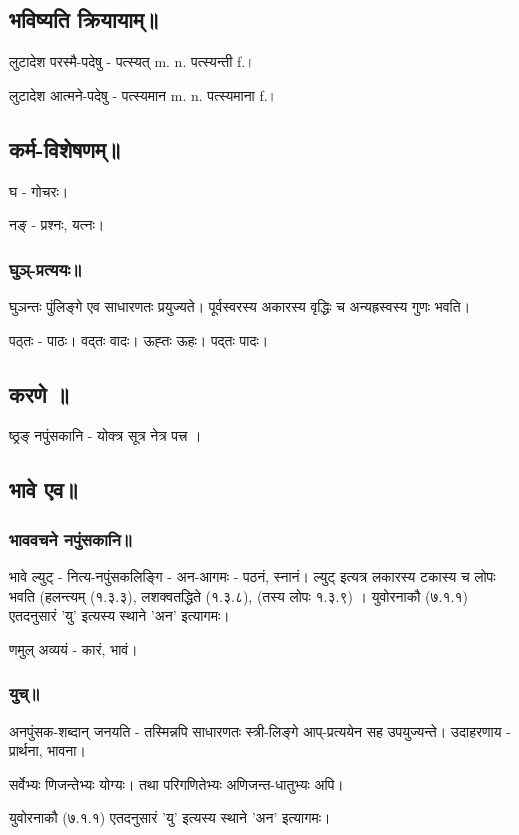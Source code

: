 \documentclass[oneside, article]{memoir}
\begin{document}
\subsection{भविष्यति क्रियायाम्॥}
लुटादेश परस्मै-पदेषु - पत्स्यत् m. n. पत्स्यन्ती f.।

लुटादेश आत्मने-पदेषु - पत्स्यमान m. n. पत्स्यमाना f.।

\subsection{कर्म-विशेषणम्॥}
घ - गोचरः।

नङ् - प्रश्नः, यत्नः।


\subsubsection{घुञ्-प्रत्ययः॥}
घुञन्तः पुंलिङ्गे एव साधारणतः प्रयुज्यते। पूर्वस्वरस्य अकारस्य वृद्धिः च  अन्यह्रस्वस्य गुणः भवति।

पठ्तः - पाठः। वद्तः वादः। ऊह्तः ऊहः। पद्तः पादः।

\subsection{करणे ॥}
ष्ठ्रङ् नपुंसकानि - योक्त्र सूत्र नेत्र पत्त्र ।

\subsection{भावे एव॥}
\subsubsection{भाववचने नपुंसकानि॥}
भावे ल्युट् - नित्य-नपुंसकलिङ्गि - अन-आगमः - पठनं, स्नानं। ल्युट् इत्यत्र लकारस्य टकास्य च लोपः भवति (हलन्त्यम् (१.३.३), लशक्वतद्धिते (१.३.८), (तस्य लोपः १.३.९) । युवोरनाकौ (७.१.१) एतदनुसारं ’यु’ इत्यस्य स्थाने ’अन’ इत्यागमः।

णमुल् अव्ययं - कारं, भावं।

\subsubsection{युच्॥}
अनपुंसक-शब्दान् जनयति - तस्मिन्नपि साधारणतः स्त्री-लिङ्गे आप्-प्रत्ययेन सह उपयुज्यन्ते। उदाहरणाय - प्रार्थना, भावना।

सर्वेभ्यः णिजन्तेभ्यः योग्यः। तथा परिगणितेभ्यः अणिजन्त-धातुभ्यः अपि।

युवोरनाकौ (७.१.१) एतदनुसारं ’यु’ इत्यस्य स्थाने ’अन’ इत्यागमः।
\end{document}
